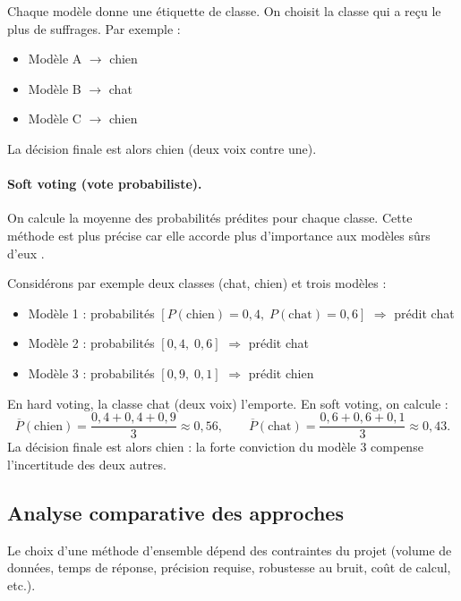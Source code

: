 Chaque modèle donne une étiquette de classe. On choisit la classe qui a reçu le plus de
suffrages. Par exemple :

\begin{itemize}
  \item Modèle A $\rightarrow$ \og chien \fg{}
  \item Modèle B $\rightarrow$ \og chat \fg{}
  \item Modèle C $\rightarrow$ \og chien \fg{}
\end{itemize}

La décision finale est alors \og chien \fg{} (deux voix contre une).

\paragraph{Soft voting (vote probabiliste).}

On calcule la moyenne des probabilités prédites pour chaque classe. Cette méthode est plus
précise car elle accorde plus d'importance aux modèles \og sûrs d'eux \fg{}.

Considérons par exemple deux classes (chat, chien) et trois modèles :
\begin{itemize}
  \item Modèle 1 : probabilités $[P(\text{chien}) = 0{,}4,\; P(\text{chat}) = 0{,}6]$ $\Rightarrow$ prédit \og chat \fg{}
  \item Modèle 2 : probabilités $[0{,}4,\; 0{,}6]$ $\Rightarrow$ prédit \og chat \fg{}
  \item Modèle 3 : probabilités $[0{,}9,\; 0{,}1]$ $\Rightarrow$ prédit \og chien \fg{}
\end{itemize}

En hard voting, la classe \og chat \fg{} (deux voix) l'emporte. En soft voting, on calcule :
\[
  \overline{P}(\text{chien}) = \frac{0{,}4 + 0{,}4 + 0{,}9}{3} \approx 0{,}56,\qquad
  \overline{P}(\text{chat})  = \frac{0{,}6 + 0{,}6 + 0{,}1}{3} \approx 0{,}43.
\]
La décision finale est alors \og chien \fg{} : la forte conviction du modèle 3 compense l'incertitude
des deux autres.

\subsection{Analyse comparative des approches}

Le choix d'une méthode d'ensemble dépend des contraintes du projet (volume de données,
temps de réponse, précision requise, robustesse au bruit, coût de calcul, etc.).

